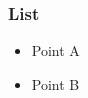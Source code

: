 \begin{frame}

\frametitle{List}
\begin{itemize}
    \pause
    \item Point A
    \pause
    \item Point B
\end{itemize}

\end{frame}